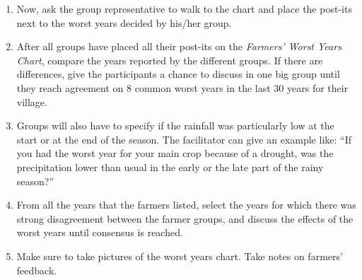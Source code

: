 \documentclass[letterpaper,10pt,english]{sphinxmanual}
\begin{document}
\begin{enumerate}
\item {} 
Now, ask the group representative to walk to the chart and place the post-its next to the worst years decided by his/her group.

\item {} 
After all groups have placed all their post-its on the \emph{Farmers’ Worst Years Chart}, compare the years reported by the different groups. If there are differences, give the participants a chance to discuss in one big group until they reach agreement on 8 common worst years in the last 30 years for their village.

\item {} 
Groups will also have to specify if the rainfall was particularly low at the start or at the end of the season. The facilitator can give an example like: ``If you had the worst year for your main crop because of a drought, was the precipitation lower than usual in the early or the late part of the rainy season?''

\item {} 
From all the years that the farmers listed, select the years for which there was strong disagreement between the farmer groups, and discuss the effects of the worst years until consensus is reached.

\item {} 
Make sure to take pictures of the worst years chart. Take notes on farmers’ feedback.

\end{enumerate}
\end{document}
